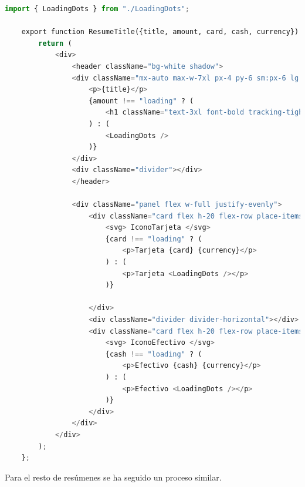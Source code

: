 \begin{lstlisting}[language=Python, caption=Componente de React para el resumen de gastos]
    import { LoadingDots } from "./LoadingDots";

    export function ResumeTitle({title, amount, card, cash, currency}) {
        return (
            <div>
                <header className="bg-white shadow">
                <div className="mx-auto max-w-7xl px-4 py-6 sm:px-6 lg:px-8">
                    <p>{title}</p>
                    {amount !== "loading" ? (
                        <h1 className="text-3xl font-bold tracking-tight text-gray-900">{amount} {currency}</h1>
                    ) : (
                        <LoadingDots />
                    )}
                </div>
                <div className="divider"></div>
                </header>
    
                <div className="panel flex w-full justify-evenly">
                    <div className="card flex h-20 flex-row place-items-center">
                        <svg> IconoTarjeta </svg>
                        {card !== "loading" ? (
                            <p>Tarjeta {card} {currency}</p>
                        ) : (
                            <p>Tarjeta <LoadingDots /></p>
                        )}
                        
                    </div>
                    <div className="divider divider-horizontal"></div>
                    <div className="card flex h-20 flex-row place-items-center">
                        <svg> IconoEfectivo </svg>
                        {cash !== "loading" ? (
                            <p>Efectivo {cash} {currency}</p>
                        ) : (
                            <p>Efectivo <LoadingDots /></p>
                        )}
                    </div>
                </div>
            </div>  
        );
    };
\end{lstlisting}

Para el resto de resúmenes se ha seguido un proceso similar. 

